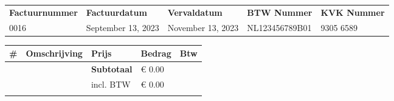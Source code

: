 \documentclass{article}%
\begin{document}
\begin{minipage}{\textwidth}%
\flushleft%
\begin{tabularx}{\textwidth}{XXXXX}%
\textbf{Factuurnummer}&\textbf{Factuurdatum}&\textbf{Vervaldatum}&\textbf{BTW Nummer}&\textbf{KVK Nummer}\\%
0016&September 13, 2023&November 13, 2023&NL123456789B01&9305 6589\\%
\end{tabularx}%
\linebreak%
\linebreak%
\linebreak%
\linebreak%
\begin{tabularx}{\textwidth}{lXlll}%
\textbf{\#}&\textbf{Omschrijving}&\textbf{Prijs}&\textbf{Bedrag}&\textbf{Btw}\\%
\hline%
&&\textbf{Subtotaal}&€ 0.00&\\%
&&incl. BTW&€ 0.00 \\ \cline{3-4}&\\%
\end{tabularx}%
\end{minipage}%
\end{document}

